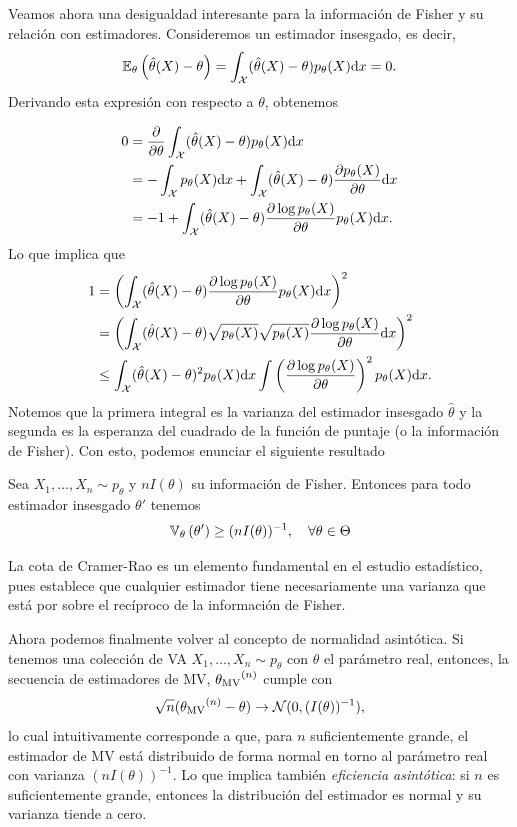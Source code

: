 Veamos ahora una desigualdad interesante para la información de Fisher y su relación con estimadores. Consideremos un estimador insesgado, es decir, 
\begin{equation}
	\mathbb{E}_\theta \left(\hat{\theta}(X)-\theta\right)=\int_{\mathcal X} (\hat{\theta}(X)-\theta)p_\theta(X){\text{d}x}=0.
\end{equation}
Derivando esta expresión con respecto a $\theta$, obtenemos

\begin{align*}
	0 &= \frac{\partial}{\partial\theta}\int_{\mathcal X} (\hat{\theta}(X)-\theta)p_\theta(X){\text{d}x}\\
	  &= -\int_{\mathcal X} p_\theta(X){\text{d}x}  + \int_{\mathcal X} (\hat{\theta}(X)-\theta)\frac{\partial p_\theta(X)}{\partial\theta}{\text{d}x}\\
	  &= -1  + \int_{\mathcal X} (\hat{\theta}(X)-\theta)\frac{\partial\log p_\theta(X) }{\partial\theta}p_\theta(X){\text{d}x}.
\end{align*}
Lo que implica que 
\begin{align*}
	1 &= \left(\int_{\mathcal X} (\hat{\theta}(X)-\theta)\frac{\partial\log p_\theta(X) }{\partial\theta}p_\theta(X){\text{d}x}\right)^2\\
	&=\left(\int_{\mathcal X} (\hat{\theta}(X)-\theta)\sqrt{p_\theta(X)}\sqrt{p_\theta(X)}\frac{\partial\log p_\theta(X) }{\partial\theta}{\text{d}x}\right)^2\\
	&\leq\int_{\mathcal X} (\hat{\theta}(X)-\theta)^2 p_\theta(X){\text{d}x} \int\left(\frac{\partial\log p_\theta(X) }{\partial\theta}\right)^2 p_\theta(X){\text{d}x}.
\end{align*}
Notemos que la primera integral es la varianza del estimador insesgado $\hat\theta$ y la segunda es la esperanza del cuadrado de la función de puntaje (o la información de Fisher). Con esto, podemos enunciar el siguiente resultado 
\begin{definition}
	Sea $X_1,\ldots,X_n \sim p_\theta$ y $nI(\theta)$ su información de Fisher. Entonces para todo estimador insesgado $\theta'$ tenemos 
	\begin{equation}
		\mathbb{V}_\theta \left(\theta'\right)\geq (nI(\theta))^{-1},\quad \forall \theta\in\Theta
	\end{equation}
\end{definition}
La cota de Cramer-Rao es un elemento fundamental en el estudio estadístico, pues establece que cualquier estimador tiene necesariamente una varianza que está por sobre el recíproco de la información de Fisher. 

Ahora podemos finalmente volver al concepto de normalidad asintótica. Si tenemos una colección de VA $X_1,\ldots,X_n\sim p_\theta$ con $\theta$ el parámetro real, entonces, la secuencia de estimadores de MV, ${\theta_\text{MV}}^{(n)}$ cumple con 
\begin{equation}
	\sqrt{n}({\theta_\text{MV}}^{(n)}-\theta)\rightarrow {\mathcal N}(0,(I(\theta))^{-1}),
\end{equation}
lo cual intuitivamente corresponde a que, para $n$ suficientemente grande, el estimador de MV está distribuido de forma normal en torno al parámetro real con varianza $(nI(\theta))^{-1}$. Lo que implica también \textit{eficiencia asintótica}: si $n$ es suficientemente grande, entonces la distribución del estimador es normal y su varianza tiende a cero. 

